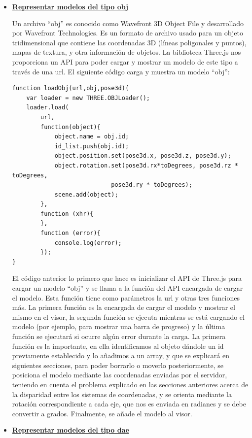 \begin{itemize}
\item {\textbf{\underline{Representar modelos del tipo obj}}

Un archivo ``obj'' es conocido como Wavefront 3D Object File y desarrollado por Wavefront Technologies. Es un formato de archivo usado para un objeto tridimensional que contiene las coordenadas 3D (líneas poligonales y puntos), mapas de textura, y otra información de objetos. La biblioteca Three.js nos proporciona un API para poder cargar y mostrar un modelo de este tipo a través de una url. El siguiente código carga y muestra un modelo ``obj'':

\begin{lstlisting}[frame=single]
function loadObj(url,obj,pose3d){
	var loader = new THREE.OBJLoader();
	loader.load(
		url,
		function(object){
			object.name = obj.id;
			id_list.push(obj.id);
			object.position.set(pose3d.x, pose3d.z, pose3d.y);
			object.rotation.set(pose3d.rx*toDegrees, pose3d.rz * toDegrees, 
							pose3d.ry * toDegrees);
			scene.add(object);
		},
		function (xhr){
		},
		function (error){
			console.log(error);
		});
}
\end{lstlisting}

El código anterior lo primero que hace es inicializar el API de Three.js para cargar un modelo ``obj'' y se llama a la función del API encargada de cargar el modelo. Esta función tiene como parámetros la url y otras tres funciones más. La primera función es la encargada de cargar el modelo y mostrar el mismo en el visor, la segunda función se ejecuta mientras se está cargando el modelo (por ejemplo, para mostrar una barra de progreso) y la última función se ejecutará si ocurre algún error durante la carga. La primera función es la importante, en ella identificamos al objeto dándole un id previamente establecido y lo añadimos a un array, y que se explicará en siguientes secciones, para poder borrarlo o moverlo posteriormente, se posiciona el modelo mediante las coordenadas enviadas por el servidor, teniendo en cuenta el problema explicado en las secciones anteriores acerca de la disparidad entre los sistemas de coordenadas, y se orienta mediante la rotación correspondiente a cada eje, que nos es enviada en radianes y se debe convertir a grados.
Finalmente, se añade el modelo al visor.}

\item{\textbf{\underline{Representar modelos del tipo dae}}

}
\end{itemize}
